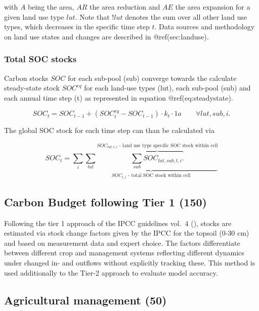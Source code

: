 \documentclass[gc, manuscript]{copernicus}
\begin{document}
with \(A\) being the area, \(AR\) the area reduction and \(AE\) the area
expansion for a given land use type \(lut\). Note that \(!lut\) denotes
the sum over all other land use types, which decreases in the specific
time step \(t\). Data sources and methodology on land use states and
changes are described in @ref(sec:landuse).

\subsubsection{Total SOC stocks}

Carbon stocks \(SOC\) for each sub-pool (sub) converge towards the
calculate steady-state stock \(SOC^{eq}\) for each land-use types (lut),
each sub-pool (sub) and each annual time step (t) as represented in
equation @ref(eq:steadystate).

\begin{equation}
SOC_{t} = SOC_{t-1} + (SOC^{eq}_{t} - SOC_{t-1}) \cdot k_{t} \cdot 1\unit{a} \qquad \forall lut, sub, i.
\label{eq:steadystate}
\end{equation}

The global SOC stock for each time step can than be calculated via

\begin{equation}
SOC_{t} = \sum_{i} \underbrace{\sum_{lut} \overbrace{\sum_{sub} SOC_{lut, sub, t, i}.}^{\text{$SOC_{lut, t, i}$ - land use type specific SOC stock within cell}}}_{\text{$SOC_{t, i}$ - total SOC stock within cell}}
\label{eq:totalstock}
\end{equation}

\newpage

\hypertarget{sec:tier1}{%
\subsection{Carbon Budget following Tier 1 (150)}\label{sec:tier1}}

Following the tier 1 approach of the IPCC guidelines vol.~4
(\citet{ipcc_2006_2006}), stocks are estimated via stock change factors
given by the IPCC for the topsoil (0-30 cm) and based on measurement
data and expert choice. The factors differentiate between different crop
and management systems reflecting different dynamics under changed in-
and outflows without explicitly tracking these. This method is used
additionally to the Tier-2 approach to evaluate model accuracy.

\hypertarget{sec:agrimanagement}{%
\subsection{Agricultural management (50)}\label{sec:agrimanagement}}
\end{document}
